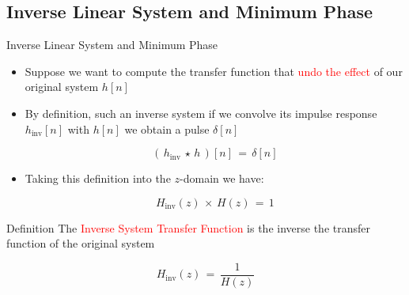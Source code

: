 \subsection{Inverse Linear System and Minimum Phase}

\begin{frame}[t]{Inverse Linear System and Minimum Phase}

\begin{itemize}

\item Suppose we want to compute the transfer function that \textcolor{red}{undo the effect} of our original system $h[n]$

\item By definition, such an inverse system if we convolve its impulse response $h_{\text{inv}}[n]$ with $h[n]$ we obtain a pulse $\delta[n]$

\begin{equation}
(\,h_{\text{inv}} \, \star \, h \,)[n] \, = \, \delta[n]
\end{equation}

\item Taking this definition into the $z$-domain we have:

\begin{equation}
H_{\text{inv}}(z) \, \times \, H(z) \, = \, 1 
\end{equation}

\end{itemize}

\begin{block}{Definition}
The \textcolor{red}{Inverse System Transfer Function} is the inverse the transfer function of the original system

	\begin{equation}
	H_{\text{inv}}(z) \, = \, \displaystyle\frac{1}{H(z)}
	\end{equation}
\end{block}


\end{frame}

